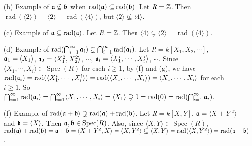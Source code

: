\begin{example}
    \begin{enumerate}
        \item[(b)] Example of $\mathfrak{a} \not \subseteq \mathfrak{b}$ when $\operatorname{rad}(\mathfrak{a}) \subseteq \operatorname{rad}(\mathfrak{b})$. Let $R = \mathbb{Z}$. Then $\operatorname{rad}(\langle 2 \rangle) = \langle 2 \rangle = \operatorname{rad}(\langle 4 \rangle)$, but $\langle 2 \rangle \not \subseteq \langle 4 \rangle$.
        \item[(c)]
            Example of $\mathfrak{a} \subsetneq \operatorname{rad}(\mathfrak{a})$. Let $R = \mathbb{Z}$. Then $\langle 4 \rangle \subsetneq \langle 2 \rangle = \operatorname{rad}(\langle 4 \rangle)$.
        \item[(d)] Example of $\operatorname{rad}(\bigcap_{i=1}^\infty \mathfrak{a}_i) \subsetneq \bigcap_{i=1}^\infty \operatorname{rad}(\mathfrak{a}_i)$. Let $R = k[X_1,X_2,\cdots]$, $\mathfrak{a}_1 = \langle X_1 \rangle$, $\mathfrak{a}_2 = \langle X_1^2,X_2^2 \rangle$, $\cdots$, $\mathfrak{a}_i = \langle X_1^i,\cdots,X_i^i \rangle$, $\cdots$. Since $\langle X_1,\cdots,X_i \rangle \in \operatorname{Spec}(R)$ for each $i \geq 1$, by (f) and (g), we have $\operatorname{rad}(\mathfrak{a}_i) = \operatorname{rad}(\langle X_1^i,\cdots,X_i^i \rangle) = \operatorname{rad}(\langle X_1,\cdots,X_i \rangle) = \langle X_1,\cdots,X_i \rangle$ for each $i \geq 1$. So $\bigcap_{i=1}^\infty \operatorname{rad}(\mathfrak{a}_i) = \bigcap_{i=1}^\infty \langle X_1,\cdots,X_i \rangle = \langle X_1 \rangle \supsetneq 0 = \operatorname{rad}(0) = \operatorname{rad}(\bigcap_{i=1}^\infty \mathfrak{a}_i)$. 
        \item[(f)] Example of $\operatorname{rad}(\mathfrak{a} + \mathfrak{b}) \supsetneq \operatorname{rad}(\mathfrak{a}) + \operatorname{rad}(\mathfrak{b})$. Let $R = k[X,Y]$, $\mathfrak{a} = \langle X+Y^2 \rangle$ and $\mathfrak{b} = \langle X \rangle$. Then $\mathfrak{a},\mathfrak{b} \in \operatorname{Spec}(R)$. Also, since $\langle X,Y \rangle \in \operatorname{Spec}(R)$, $\operatorname{rad}(\mathfrak{a}) + \operatorname{rad}(\mathfrak{b}) = \mathfrak{a} + \mathfrak{b} = \langle X+Y^2,X \rangle = \langle X,Y^2 \rangle \subsetneq \langle X,Y \rangle = \operatorname{rad}(\langle X,Y^2 \rangle) = \operatorname{rad}(\mathfrak{a} + \mathfrak{b})$.
    \end{enumerate}
\end{example}


